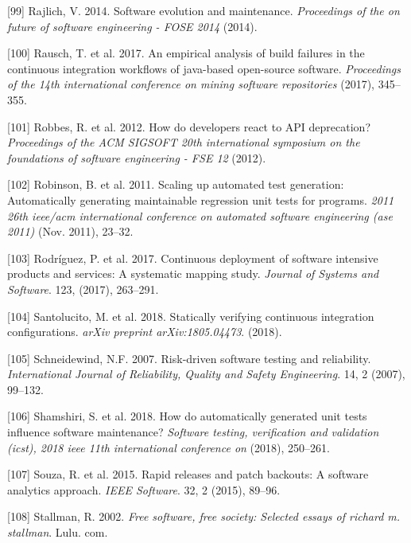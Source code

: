 \documentclass[]{book}
\begin{document}
\hypertarget{ref-Rajlich2014}{}
{[}99{]} Rajlich, V. 2014. Software evolution and maintenance.
\emph{Proceedings of the on future of software engineering - FOSE 2014}
(2014).

\hypertarget{ref-rausch2017empirical}{}
{[}100{]} Rausch, T. et al. 2017. An empirical analysis of build
failures in the continuous integration workflows of java-based
open-source software. \emph{Proceedings of the 14th international
conference on mining software repositories} (2017), 345--355.

\hypertarget{ref-Robbes2012}{}
{[}101{]} Robbes, R. et al. 2012. How do developers react to API
deprecation? \emph{Proceedings of the ACM SIGSOFT 20th international
symposium on the foundations of software engineering - FSE 12} (2012).

\hypertarget{ref-robinson2011}{}
{[}102{]} Robinson, B. et al. 2011. Scaling up automated test
generation: Automatically generating maintainable regression unit tests
for programs. \emph{2011 26th ieee/acm international conference on
automated software engineering (ase 2011)} (Nov. 2011), 23--32.

\hypertarget{ref-rodriguez2017a}{}
{[}103{]} Rodríguez, P. et al. 2017. Continuous deployment of software
intensive products and services: A systematic mapping study.
\emph{Journal of Systems and Software}. 123, (2017), 263--291.

\hypertarget{ref-santolucito2018statically}{}
{[}104{]} Santolucito, M. et al. 2018. Statically verifying continuous
integration configurations. \emph{arXiv preprint arXiv:1805.04473}.
(2018).

\hypertarget{ref-schneidewind2007}{}
{[}105{]} Schneidewind, N.F. 2007. Risk-driven software testing and
reliability. \emph{International Journal of Reliability, Quality and
Safety Engineering}. 14, 2 (2007), 99--132.

\hypertarget{ref-shamshiri2018automatically}{}
{[}106{]} Shamshiri, S. et al. 2018. How do automatically generated unit
tests influence software maintenance? \emph{Software testing,
verification and validation (icst), 2018 ieee 11th international
conference on} (2018), 250--261.

\hypertarget{ref-souza2015a}{}
{[}107{]} Souza, R. et al. 2015. Rapid releases and patch backouts: A
software analytics approach. \emph{IEEE Software}. 32, 2 (2015), 89--96.

\hypertarget{ref-Stallman2002}{}
{[}108{]} Stallman, R. 2002. \emph{Free software, free society: Selected
essays of richard m. stallman}. Lulu. com.
\end{document}
